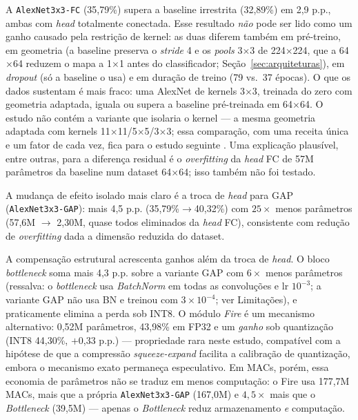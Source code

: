 \documentclass[conference]{IEEEtran}
\begin{document}
A \texttt{AlexNet3x3-FC} (35,79\%) supera a baseline irrestrita (32,89\%) em 2,9 p.p., ambas com
\textit{head} totalmente conectada. Esse resultado \emph{não} pode ser lido como um ganho causado
pela restrição de kernel: as duas diferem também em pré-treino, em geometria (a baseline preserva o
\textit{stride} 4 e os \textit{pools} 3$\times$3 de 224$\times$224, que a 64$\times$64 reduzem o
mapa a 1$\times$1 antes do classificador; Seção~\ref{sec:arquiteturas}), em \textit{dropout} (só a
baseline o usa) e em duração de treino (79 vs.\ 37 épocas). O que os dados sustentam é mais fraco:
uma AlexNet de kernels 3$\times$3, treinada do zero com geometria adaptada, iguala ou supera a
baseline pré-treinada em 64$\times$64. O estudo não contém a variante que isolaria o kernel — a
mesma geometria adaptada com kernels 11$\times$11/5$\times$5/3$\times$3; essa comparação, com uma
receita única e um fator de cada vez, fica para o estudo seguinte \cite{souza2026artigo}. Uma
explicação plausível, entre outras, para a diferença residual é o
\textit{overfitting} da \textit{head} FC de 57M parâmetros da baseline num dataset 64$\times$64;
isso também não foi testado.

A mudança de efeito isolado mais claro é a troca de \textit{head} para GAP
(\texttt{AlexNet3x3-GAP}): mais 4,5 p.p. (35,79\%$\to$40,32\%) com $25\times$ menos parâmetros
(57,6M $\to$ 2,30M, quase todos eliminados da \textit{head} FC), consistente com redução de \textit{overfitting} dada a dimensão
reduzida do dataset.

A compensação estrutural acrescenta ganhos além da troca de \textit{head}. O bloco
\textit{bottleneck} soma mais 4,3 p.p.
sobre a variante GAP com $6\times$ menos parâmetros (ressalva: o \textit{bottleneck} usa
\textit{BatchNorm} em todas as convoluções e lr $10^{-3}$; a variante GAP não usa BN e treinou com
$3\times10^{-4}$; ver Limitações), e praticamente
elimina a perda sob INT8. O
módulo \textit{Fire} é um mecanismo alternativo: 0,52M parâmetros, 43,98\% em FP32 e um \emph{ganho}
sob quantização (INT8 44,30\%, $+$0,33 p.p.) — propriedade rara neste estudo, compatível com a
hipótese de que a compressão \textit{squeeze-expand} facilita a calibração de quantização, embora o
mecanismo exato permaneça especulativo. Em MACs, porém, essa economia de parâmetros não se traduz em
menos computação: o Fire usa 177,7M MACs, mais que a própria \texttt{AlexNet3x3-GAP} (167,0M) e
$4,5\times$ mais que o \textit{Bottleneck} (39,5M) — apenas o \textit{Bottleneck} reduz
armazenamento \emph{e} computação.
\end{document}
